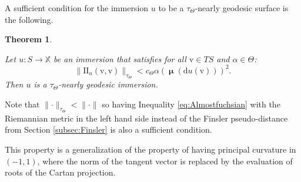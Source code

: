 \documentclass[reqno,10pt]{amsart}
\theoremstyle{plain}
\newtheorem{thm}{Theorem}[section]
\theoremstyle{definition}
\theoremstyle{remark}
\newcommand{\type}{\tau}
\DeclareMathOperator{\Cartan}{\boldsymbol{\mu}}
\newcommand{\II}{\mathrm{I\!I}}
\newcommand{\X}{\mathbb{X}}
\begin{document}
\medskip

A sufficient condition for the immersion $u$ to be a $\type_\Theta$-nearly geodesic surface is the following.


\begin{thm}
\label{thm:Sufficient condition}

Let $u:S\to \X$ be an immersion that satisfies for all $\mathrm{v}\in TS$ and $\alpha\in \Theta$:
\begin{equation}\label{eq:Almostfuchsian}\lVert\II_u(\mathrm{v},\mathrm{v}) \rVert_{\type_\Theta}<c_\Theta \alpha\left(\Cartan\left(\mathrm{d}u(\mathrm{v})\right)\right)^2.
\end{equation}
Then $u$ is a $\type_\Theta$-nearly geodesic immersion.
\end{thm}

Note that $\lVert\cdot \rVert_{\type_\Theta}<\lVert\cdot\rVert$ so having Inequality \eqref{eq:Almostfuchsian} with the Riemannian metric in the left hand side instead of the Finsler pseudo-distance from Section \ref{subsec:Finsler} is also a sufficient condition.

\medskip

This property is a generalization of the property of having principal curvature in $(-1,1)$, where the norm of the tangent vector is replaced by the evaluation of roots of the Cartan projection.

\medskip
\end{document}
